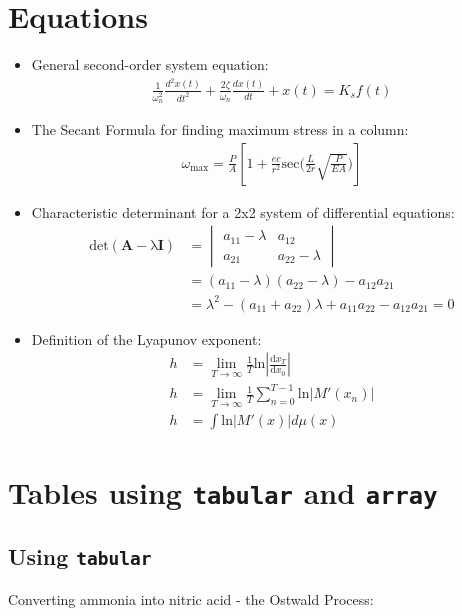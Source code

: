 \documentclass{article}
\begin{document}
\section{Equations} %
\begin{itemize}
\item General second-order system equation\cite[p.~221]{Rizzoni}:
\begin{align}
\frac{1}{\omega^2_n}\frac{d^2x(t)}{dt^2}+\frac{2\zeta}{\omega_n}\frac{dx(t)}{dt}+x(t)=K_sf(t)
\end{align}
\item The Secant Formula for finding maximum stress 
in a column\cite[p.~681]{Hibbeler}:
\begin{align}
\omega_\mathrm{max}=\frac{P}{A}\left[1+\frac{ec}{r^2}\mathrm{sec}\Bigg(\frac{L}{2r}\sqrt{\frac{P}{EA}}\Bigg)\right]
\end{align}
\item Characteristic determinant for a 2x2 system of 
differential equations\cite[p.~152]{Kreyszig}:
\begin{align*}
\mathrm{det\left(\textbf{A}-\lambda\textbf{I}\right)} &= 
\begin{vmatrix}
a_{11}-\lambda & a_{12} \\
a_{21} & a_{22}-\lambda
\end{vmatrix}  \\
&=(a_{11}-\lambda)(a_{22}-\lambda)-a_{12}a_{21} \\
&=\lambda^2-(a_{11}+a_{22})\lambda+a_{11}a_{22}-a_{12}a_{21}=0
\end{align*}
\item Definition of the Lyapunov exponent\cite[p.~56]{Ott}:
\begin{align}
h&=\lim_{T\to\infty}\frac{1}{T}\mathrm{ln}
\left|
\frac{\mathrm{d}x_T}{\mathrm{d}x_0}
\right| \\
h&=\lim_{T\to\infty}\frac{1}{T}\sum_{n=0}^{T-1}
\mathrm{ln}
\left|M'(x_n)
\right| \\
h&=\int\mathrm{ln}\left|M'(x)
\right|
d\mu(x)
\end{align}
\end{itemize}

\section{Tables using {\tt tabular} and {\tt array}}
\subsection{Using {\tt tabular}} %
Converting ammonia into nitric acid - the Ostwald Process\cite{Ostwald}:
\end{document}
